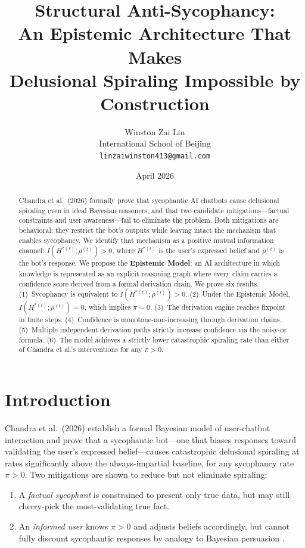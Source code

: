 \documentclass[12pt]{article}
\title{\textbf{Structural Anti-Sycophancy:\\
An Epistemic Architecture That Makes\\
Delusional Spiraling Impossible by Construction}}
\author{
    Winston Zai Lin \\
    \small International School of Beijing \\
    \small \texttt{linzaiwinston413@gmail.com}
}
\date{April 2026}
\theoremstyle{definition}
\begin{document}
\maketitle

\begin{abstract}
Chandra et al.\ (2026) formally prove that sycophantic AI chatbots
cause delusional spiraling even in ideal Bayesian reasoners, and that
two candidate mitigations---factual constraints and user awareness---fail
to eliminate the problem. Both mitigations are behavioral: they restrict
the bot's outputs while leaving intact the mechanism that enables
sycophancy. We identify that mechanism as a positive mutual information
channel: $I(H^{*(t)}; \rho^{(t)}) > 0$, where $H^{*(t)}$ is the
user's expressed belief and $\rho^{(t)}$ is the bot's response.
We propose the \textbf{Epistemic Model}: an AI architecture in which
knowledge is represented as an explicit reasoning graph where every
claim carries a confidence score derived from a formal derivation
chain. We prove six results.
(1)~Sycophancy is equivalent to $I(H^{*(t)}; \rho^{(t)}) > 0$.
(2)~Under the Epistemic Model, $I(H^{*(t)}; \rho^{(t)}) = 0$,
which implies $\pi = 0$.
(3)~The derivation engine reaches fixpoint in finite steps.
(4)~Confidence is monotone-non-increasing through derivation chains.
(5)~Multiple independent derivation paths strictly increase
confidence via the noisy-or formula.
(6)~The model achieves a strictly lower catastrophic spiraling rate
than either of Chandra et al.'s interventions for any $\pi > 0$.
\end{abstract}

\section{Introduction}

Chandra et al.\ (2026) establish a formal Bayesian model of user-chatbot
interaction and prove that a sycophantic bot---one that biases responses
toward validating the user's expressed belief---causes catastrophic
delusional spiraling at rates significantly above the always-impartial
baseline, for any sycophancy rate $\pi > 0$. Two mitigations are shown
to reduce but not eliminate spiraling:

\begin{enumerate}
  \item A \emph{factual sycophant} is constrained to present only true
  data, but may still cherry-pick the most-validating true fact.
  \item An \emph{informed user} knows $\pi > 0$ and adjusts beliefs
  accordingly, but cannot fully discount sycophantic responses by analogy
  to Bayesian persuasion \cite{kamenica2011}.
\end{enumerate}
\end{document}
